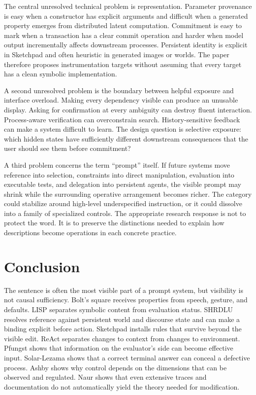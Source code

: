 \documentclass[11pt]{article}
\begin{document}
The central unresolved technical problem is representation. Parameter provenance is easy when a constructor has explicit arguments and difficult when a generated property emerges from distributed latent computation. Commitment is easy to mark when a transaction has a clear commit operation and harder when model output incrementally affects downstream processes. Persistent identity is explicit in Sketchpad and often heuristic in generated images or worlds. The paper therefore proposes instrumentation targets without assuming that every target has a clean symbolic implementation.

A second unresolved problem is the boundary between helpful exposure and interface overload. Making every dependency visible can produce an unusable display. Asking for confirmation at every ambiguity can destroy fluent interaction. Process-aware verification can overconstrain search. History-sensitive feedback can make a system difficult to learn. The design question is selective exposure: which hidden states have sufficiently different downstream consequences that the user should see them before commitment?

A third problem concerns the term ``prompt'' itself. If future systems move reference into selection, constraints into direct manipulation, evaluation into executable tests, and delegation into persistent agents, the visible prompt may shrink while the surrounding operative arrangement becomes richer. The category could stabilize around high-level underspecified instruction, or it could dissolve into a family of specialized controls. The appropriate research response is not to protect the word. It is to preserve the distinctions needed to explain how descriptions become operations in each concrete practice.

\section{Conclusion}

The sentence is often the most visible part of a prompt system, but visibility is not causal sufficiency. Bolt's square receives properties from speech, gesture, and defaults. LISP separates symbolic content from evaluation status. SHRDLU resolves reference against persistent world and discourse state and can make a binding explicit before action. Sketchpad installs rules that survive beyond the visible edit. ReAct separates changes to context from changes to environment. Pfungst shows that information on the evaluator's side can become effective input. Solar-Lezama shows that a correct terminal answer can conceal a defective process. Ashby shows why control depends on the dimensions that can be observed and regulated. Naur shows that even extensive traces and documentation do not automatically yield the theory needed for modification.
\end{document}
